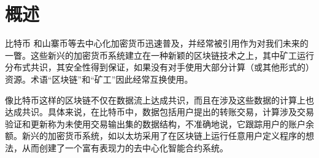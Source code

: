 \documentclass{xduugtrans}
\begin{document}
\frontmatter
\mainmatter
\chapter{概述}
比特币\cite{ref1} 和山寨币等去中心化加密货币迅速普及，并经常被引用作为对我们未来的一瞥。这些新兴的加密货币系统建立在一种新颖的区块链技术之上，其中矿工运行分布式共识，其安全性得到保证，如果没有对手使用大部分计算（或其他形式的）资源。术语“区块链”和“矿工”因此经常互换使用。

像比特币这样的区块链不仅在数据流上达成共识，而且在涉及这些数据的计算上也达成共识。具体来说，在比特币中，数据包括用户提出的转账交易，计算涉及交易验证和更新称为未使用交易输出集的数据结构，不准确地说，它跟踪用户的账户余额。新兴的加密货币系统，如以太坊采用了在区块链上运行任意用户定义程序的想法，从而创建了一个富有表现力的去中心化智能合约系统。
\end{document}
